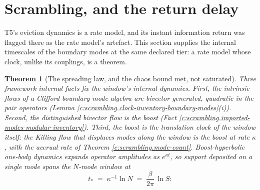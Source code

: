 \documentclass[11pt]{article}
\newtheorem{theorem}{Theorem}[section]
\theoremstyle{definition}
\theoremstyle{plain}
\newcommand{\changedmark}[2]{\marginpar{\raggedright\scriptsize\color{#1}#2}}
\begin{document}
\section{Scrambling, and the return delay}

\label{c:note.scrambling.setting-scrambling-return-delay}
T5's eviction dynamics is a rate model, and its instant information return was flagged there as the rate model's artefact. This section supplies the internal timescales of the boundary modes at the same declared tier: a rate model whose clock, unlike its couplings, is a theorem.

\begin{theorem}[The spreading law, and the chaos bound met, not saturated]\label{c:scrambling.spreading-law-chaos-bound-saturated}
\changedmark{BrickRed}{corrected since the deposit}
Three framework-internal facts fix the window's internal dynamics. First, the intrinsic flows of a Clifford boundary-mode algebra are bivector-generated, quadratic in the pair operators (Lemma \ref{c:scrambling.clock-inventory-boundary-modes}(i)). Second, the distinguished bivector flow is the boost (Fact \ref{c:scrambling.imported-modes-modular-inventory}). Third, the boost is the translation clock of the window itself: the Killing flow that displaces modes along the window is the boost at rate $\kappa$, with the accrual rate of Theorem \ref{c:scrambling.mode-count}. Boost-hyperbolic one-body dynamics expands operator amplitudes as $e^{\kappa t}$, so support deposited on a single mode spans the $N$-mode window at
\[
t_* \;=\; \kappa^{-1}\ln N \;=\; \frac{\beta}{2\pi}\,\ln S :
\]

\end{theorem}
\end{document}
